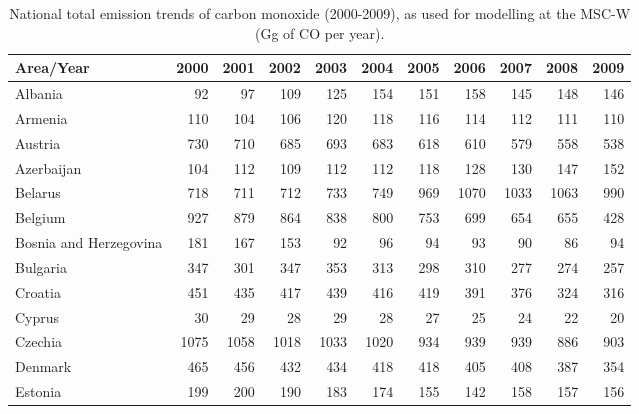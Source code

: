  \begin{table}
 \caption{National total emission trends of  carbon monoxide (2000-2009), as used for modelling at the MSC-W (Gg of CO per year).}
 
 \vspace{15pt}
 
 \scriptsize
 \centering
 \begin{tabular}{|l|r|r|r|r|r|r|r|r|r|r|}
 \hline
                     Area/Year&   2000&   2001&   2002&   2003&   2004&   2005&   2006&   2007&   2008&   2009\\\hline\hline
                       Albania&     92&     97&    109&    125&    154&    151&    158&    145&    148&    146\\\hline
                       Armenia&    110&    104&    106&    120&    118&    116&    114&    112&    111&    110\\\hline
                       Austria&    730&    710&    685&    693&    683&    618&    610&    579&    558&    538\\\hline
                    Azerbaijan&    104&    112&    109&    112&    112&    118&    128&    130&    147&    152\\\hline
                       Belarus&    718&    711&    712&    733&    749&    969&   1070&   1033&   1063&    990\\\hline
                       Belgium&    927&    879&    864&    838&    800&    753&    699&    654&    655&    428\\\hline
        Bosnia and Herzegovina&    181&    167&    153&     92&     96&     94&     93&     90&     86&     94\\\hline
                      Bulgaria&    347&    301&    347&    353&    313&    298&    310&    277&    274&    257\\\hline
                       Croatia&    451&    435&    417&    439&    416&    419&    391&    376&    324&    316\\\hline
                        Cyprus&     30&     29&     28&     29&     28&     27&     25&     24&     22&     20\\\hline
                       Czechia&   1075&   1058&   1018&   1033&   1020&    934&    939&    939&    886&    903\\\hline
                       Denmark&    465&    456&    432&    434&    418&    418&    405&    408&    387&    354\\\hline
                       Estonia&    199&    200&    190&    183&    174&    155&    142&    158&    157&    156\\\hline

\end{tabular}
\end{table}
